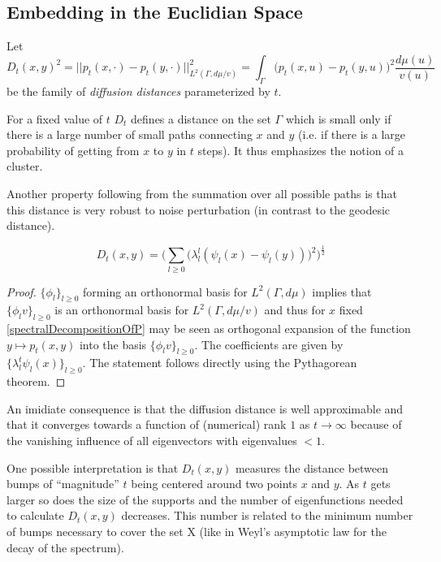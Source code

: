 \subsection{Embedding in the Euclidian Space}
\begin{definition}
Let $$D_t(x,y)^2 =
||p_t(x, \cdotp) - p_t(y, \cdotp)||_{L^2(\Gamma, d\mu/v)}^2 =
\int_\Gamma \big(p_t(x, u) - p_t(y, u)\big)^2 \frac{d\mu(u)}{v(u)}$$
be the family of \textit{diffusion distances} parameterized by $t$.
\end{definition}

For a fixed value of $t$ $D_t$ defines a distance on the set $\Gamma$ which is small only if there is a large number of small paths connecting $x$ and $y$ (i.e. if there is a large probability of getting from $x$ to $y$ in $t$ steps). It thus emphasizes the notion of a cluster.

Another property following from the summation over all possible paths is that this distance is very robust to noise perturbation (in contrast to the geodesic distance).

\begin{theorem}
$$D_t(x,y)=\bigg(\sum_{l\geq 0} \Big(\lambda_l^{l}(\psi_l(x) - \psi_l(y))\Big)^2 \bigg)^{\frac{1}{2}}$$
\end{theorem}

\begin{proof}
$\{\phi_l\}_{l\geq 0}$ forming an orthonormal basis for $L^2(\Gamma, d\mu)$ implies that $\{\phi_l v\}_{l\geq 0}$ is an orthonormal basis for $L^2(\Gamma, d\mu/v)$ and thus for $x$ fixed \ref{spectralDecompositionOfP} may be seen as orthogonal expansion of the function $y \mapsto p_t(x,y)$ into the basis $\{\phi_l v\}_{l\geq 0}$.
The coefficients are given by $\{\lambda_l^t \psi_l(x)\}_{l\geq 0}$. The statement follows directly using the Pythagorean theorem.
\end{proof}

An imidiate consequence is that the diffusion distance is well approximable and that it converges towards a function of (numerical) rank $1$ as $t\rightarrow\infty$ because of the vanishing influence of all eigenvectors with eigenvalues $<1$.

One possible interpretation is that $D_t(x,y)$ measures the distance between bumps of ``magnitude'' $t$ being centered around two points $x$ and $y$. As $t$ gets larger so does the size of the supports and the number of eigenfunctions needed to calculate $D_t(x,y)$ decreases. This number is related to the minimum number of bumps necessary to cover the set X (like in Weyl’s asymptotic law for the decay of the spectrum).

